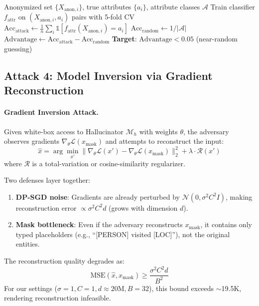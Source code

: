 \documentclass[11pt, a4paper]{article}
\newcommand{\N}{\mathcal{N}}
\begin{document}
\begin{algorithm}[H]
\caption{Attribute Inference Evaluation}
\label{alg:attr_inference}
\begin{algorithmic}[1]
\Require Anonymized set $\{X_{\text{anon},i}\}$, true attributes $\{a_i\}$, attribute classes $\mathcal{A}$
\State Train classifier $f_{\text{attr}}$ on $(X_{\text{anon},i}, a_i)$ pairs with 5-fold CV
\State $\text{Acc}_{\text{attack}} \leftarrow \frac{1}{n}\sum_{i} \mathbb{1}[f_{\text{attr}}(X_{\text{anon},i}) = a_i]$
\State $\text{Acc}_{\text{random}} \leftarrow 1 / |\mathcal{A}|$
\State $\text{Advantage} \leftarrow \text{Acc}_{\text{attack}} - \text{Acc}_{\text{random}}$
\State \textbf{Target}: $\text{Advantage} < 0.05$ (near-random guessing)
\end{algorithmic}
\end{algorithm}

\subsection{Attack 4: Model Inversion via Gradient Reconstruction}

\paragraph{Gradient Inversion Attack.}
Given white-box access to Hallucinator $\mathcal{M}_h$ with weights $\theta$, the adversary observes gradients $\nabla_\theta \mathcal{L}(x_{\text{mask}})$ and attempts to reconstruct the input:
\begin{equation}
\hat{x} = \arg\min_{x'} \|\nabla_\theta \mathcal{L}(x') - \nabla_\theta \mathcal{L}(x_{\text{mask}})\|_2^2 + \lambda \cdot \mathcal{R}(x')
\end{equation}
where $\mathcal{R}$ is a total-variation or cosine-similarity regularizer.

\begin{keyresult}
Two defenses layer together:
\begin{enumerate}[nosep]
  \item \textbf{DP-SGD noise}: Gradients are already perturbed by $\N(0, \sigma^2 C^2 I)$, making reconstruction error $\propto \sigma^2 C^2 d$ (grows with dimension $d$).
  \item \textbf{Mask bottleneck}: Even if the adversary reconstructs $x_{\text{mask}}$, it contains only typed placeholders (e.g., ``[PERSON] visited [LOC]''), not the original entities.
\end{enumerate}
The reconstruction quality degrades as:
\begin{equation}
\text{MSE}(\hat{x}, x_{\text{mask}}) \geq \frac{\sigma^2 C^2 d}{B^2}
\end{equation}
For our settings ($\sigma=1, C=1, d \approx 20\text{M}, B=32$), this bound exceeds $\sim$19.5K, rendering reconstruction infeasible.
\end{keyresult}
\end{document}
